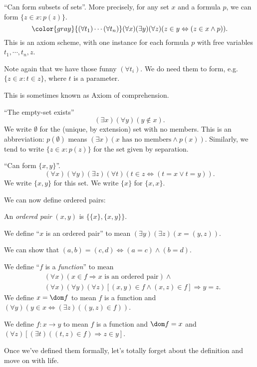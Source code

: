 \documentclass[a4paper]{article}
\begin{document}
\begin{axiom}
  ``Can form subsets of sets''. More precisely, for any set $x$ and a formula $p$, we can form $\{z\in x: p(z)\}$.
  \[
    {\color{gray}{(\forall t_1)\cdots(\forall t_n)}}(\forall x)(\exists y)(\forall z)(z\in y \Leftrightarrow (z\in x\wedge p)).
  \]
  This is an axiom scheme, with one instance for each formula $p$ with free variables $t_1, \cdots, t_n, z$.

  Note again that we have those funny $(\forall t_i)$. We do need them to form, e.g. $\{z\in x: t\in z\}$, where $t$ is a parameter.

  This is sometimes known as Axiom of comprehension.
\end{axiom}
\begin{axiom}
  ``The empty-set exists''
  \[
    (\exists x)(\forall y)(y\not\in x).
  \]
  We write $\emptyset$ for the (unique, by extension) set with no members. This is an abbreviation: $p(\emptyset)$ means $(\exists x)(x\text{ has no members}\wedge p(x))$. Similarly, we tend to write $\{z\in x: p(z)\}$ for the set given by separation.
\end{axiom}
\begin{axiom}
  ``Can form $\{x, y\}$''.
  \[
    (\forall x)(\forall y)(\exists z)(\forall t)(t\in z \Leftrightarrow (t= x\vee t  = y)).
  \]
  We write $\{x, y\}$ for this set. We write $\{x\}$ for $\{x, x\}$.
\end{axiom}

We can now define ordered pairs:
\begin{defi}
  An \emph{ordered pair} $(x, y)$ is $\{\{x\}, \{x, y\}\}$.

  We define ``$x$ is an ordered pair'' to mean $(\exists y)(\exists z)(x = (y, z))$.
\end{defi}
We can show that $(a, b) = (c, d) \Leftrightarrow (a = c) \wedge (b = d)$.

\begin{defi}[Function]
  We define ``$f$ is a \emph{function}'' to mean
  \begin{align*}
    & (\forall x)(x\in f\Rightarrow x\text{ is an ordered pair})\wedge\\
    & (\forall x)(\forall y)(\forall z)[(x, y)\in f \wedge (x, z)\in f]\Rightarrow y = z.
  \end{align*}
  We define $x = \dom  f$ to mean $f$ is a function and $(\forall y)(y\in x \Leftrightarrow (\exists z)((y, z)\in f))$.

  We define $f: x\to y$ to mean $f$ is a function and $\dom f = x$ and $(\forall z)[(\exists t)((t, z)\in f)\Rightarrow z\in y]$.
\end{defi}
Once we've defined them formally, let's totally forget about the definition and move on with life.
\end{document}

